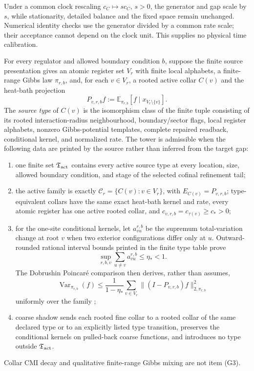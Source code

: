 Under a common clock rescaling \(c_C\mapsto s c_C\), \(s>0\), the
generator and gap scale by \(s\), while stationarity, detailed balance and
the fixed space remain unchanged. Numerical identity checks use the
generator divided by a common rate scale; their acceptance cannot depend
on the clock unit. This supplies no physical time calibration.

\begin{definition}
\label{def:admissible-atomic-collar-tower}
For every regulator and allowed boundary condition \(b\), suppose the finite source presentation
gives an atomic register set \(V_r\) with finite local alphabets, a finite-range Gibbs law \(\pi_{r,b}\), and, for each
\(v\in V_r\), a rooted active collar \(C(v)\) and the heat-bath projection
\[
P_{v,r,b}f:=\mathbb E_{\pi_{r,b}}[f\mid x_{V_r\setminus\{v\}}].
\]
The \emph{source type} of \(C(v)\) is the isomorphism class of the finite tuple consisting of its
rooted interaction-radius neighbourhood, boundary/sector flags, local register alphabets,
nonzero Gibbs-potential templates, complete repaired readback, conditional kernel, and normalized
rate.  The tower is admissible when the following data are printed by the source rather than
inferred from the target gap:
\begin{enumerate}[label=\textup{(G\arabic*)},leftmargin=2em]
\item one finite set \(\mathfrak T_{\rm act}\) contains every active source type at every
location, size, allowed boundary condition, and stage of the selected cofinal refinement tail;
\item the active family is exactly \(\mathcal C_r=\{C(v):v\in V_r\}\), with
\(E_{C(v)}=P_{v,r,b}\); type-equivalent collars have the same exact heat-bath kernel and rate,
every atomic register has one active rooted collar, and
\(c_{v,r,b}=c_{\tau(v)}\ge c_*>0\);
\item for the one-site conditional kernels, let \(a_{vu}^{r,b}\) be the supremum total-variation
change at root \(v\) when two exterior configurations differ only at \(u\).  Outward-rounded
rational interval bounds printed in the finite type table prove
\[
\sup_{r,b,v}\sum_{u\ne v}a_{vu}^{r,b}\le\eta_*<1.
\tag{INF}
\]
The Dobrushin Poincar\'e comparison then derives, rather than assumes,
\[
\operatorname{Var}_{\pi_{r,b}}(f)
\le\frac{1}{1-\eta_*}\sum_{v\in V_r}\|(I-P_{v,r,b})f\|_{2,\pi_{r,b}}^2
\tag{AT}
\]
uniformly over the family \cite{wuDobrushin06};
\item coarse shadow sends each rooted fine collar to a rooted collar of the same declared type or
to an explicitly listed type transition, preserves the conditional kernels on pulled-back coarse
functions, and introduces no type outside \(\mathfrak T_{\rm act}\).
\end{enumerate}
Collar CMI decay and qualitative finite-range Gibbs mixing are not item \textup{(G3)}.
\end{definition}

